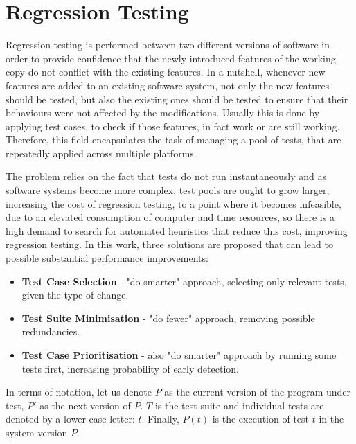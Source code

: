 
\section{Regression Testing}

Regression testing is performed between two different versions of software in order to provide confidence that the newly introduced features of the working copy do not conflict with the existing features.
In a nutshell, whenever new features are added to an existing software system, not only the new features should be tested, but also the existing ones should be tested to ensure that their behaviours were not affected by the modifications. Usually this is done by applying test cases, to check if those features, in fact work or are still working. Therefore, this field encapsulates the task of managing a pool of tests, that are repeatedly applied across multiple platforms. \cite{ShinThesis} 

The problem relies on the fact that tests do not run instantaneously and as software systems become more complex, test pools are ought to grow larger, increasing the cost of regression testing, to a point where it becomes infeasible, due to an elevated consumption of computer and time resources, so there is a high demand to search for automated heuristics that reduce this cost, improving regression testing. In this work, three solutions are proposed that can lead to possible substantial performance improvements:

\begin{itemize}
	\item \textbf{Test Case Selection} - "do smarter" approach, selecting only relevant tests, given the type of change.
	\item \textbf{Test Suite Minimisation} - "do fewer" approach, removing possible redundancies.
	\item \textbf{Test Case Prioritisation} - also "do smarter" approach by running some tests first, increasing probability of early detection. \cite{ShinThesis}
\end{itemize}

In terms of notation, let us denote $P$ as the current version of the program under test, $P'$ as the next
version of $P$. $T$ is the test suite and individual tests are denoted by a lower case letter: $t$. Finally, $P(t)$ is the execution of test $t$ in the system version $P$.


